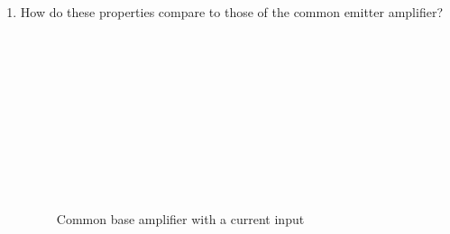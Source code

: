 \documentclass{article}
\begin{document}
\begin{enumerate}
	\item How do these properties compare to those of the common emitter amplifier?
	~\\~\\~\\~\\~\\~\\~\\~\\~\\~\\~\\

	\begin{figure}[!htb]
		
		\centerline{\box\graph}
		\caption{Common base amplifier with a current input}
		\label{cbamp}
	\end{figure}


\end{enumerate}
\end{document}
